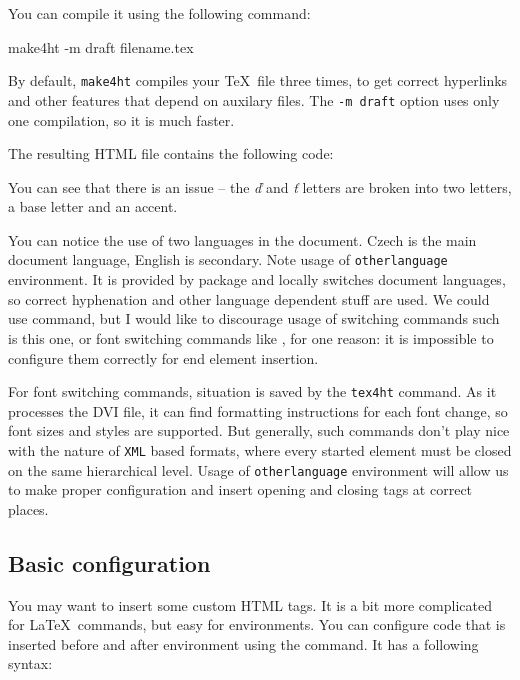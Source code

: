 
You can compile it using the following command:

\begin{shellcommand}
make4ht -m draft filename.tex
\end{shellcommand}

By default, \texttt{make4ht} compiles your \TeX\ file three times, to get correct hyperlinks 
and other features that depend on auxilary files. The \texttt{-m draft} option uses
only one compilation, so it is much faster.

The resulting HTML file contains the following code:


You can see that there is an issue -- the \textit{ď} and \textit{ť} letters are broken into
two letters, a base letter and an accent.

You can notice the use of two languages in the document. 
Czech is the main document language, English is secondary. 
Note usage of \texttt{otherlanguage} environment. 
It is provided by  package and locally
switches document languages, so correct hyphenation and other language
dependent stuff are used. We could use
\texcommand{\selectlanguage} command, but I would like to
discourage usage of switching commands such is this one, or font
switching commands like \texcommand{\bfseries}, for one
reason: it is impossible to configure them correctly for end element
insertion. 

For font switching commands, situation is saved by the
\texttt{tex4ht} command. As it processes the DVI file, it can find formatting instructions for each
font change, so font sizes and styles are supported. 
But generally, such commands don't play nice with the nature of
\texttt{XML} based formats, where every started element must be closed
on the same hierarchical level. 
Usage of \texttt{otherlanguage} environment will allow us to make proper
configuration and insert opening and closing tags at correct places.

\subsection{Basic configuration}

You may want to insert some custom HTML tags. It is a bit more complicated for
\LaTeX\ commands, but easy for environments. You can configure code that is 
inserted before and after environment using the \texcommand{\ConfigureEnv} command.
It has a following syntax:

